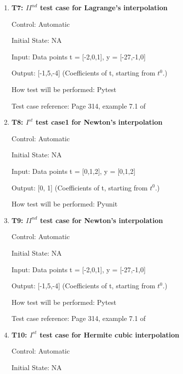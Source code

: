 \documentclass[12pt, titlepage]{article}
\begin{document}
\begin{enumerate}
\item{\textbf{T7: ${II}^{nd}$ test case for Lagrange's interpolation} \\}

Control: Automatic

Initial State: NA

Input: Data points t = [-2,0,1], y = [-27,-1,0]

Output: [-1,5,-4] (Coefficients of t, starting from $t^{0}$.)

How test will be performed: Pytest

Test case reference: Page 314, example 7.1 of  ~\cite{Health1997}\\


\item{\textbf{T8: $I^{st}$ test case1 for Newton's interpolation} \\}

Control: Automatic 

Initial State: NA

Input: Data points t = [0,1,2], y = [0,1,2]

Output: [0, 1] (Coefficients of t, starting from $t^{0}$.)

How test will be performed: Pyunit\\


\item{\textbf{T9: ${II}^{nd}$ test case for Newton's interpolation} \\}

Control: Automatic

Initial State: NA

Input: Data points t = [-2,0,1], y = [-27,-1,0]

Output: [-1,5,-4] (Coefficients of t, starting from $t^{0}$.)

How test will be performed: Pytest

Test case reference: Page 314, example 7.1 of \cite{Health1997}\\




\item{\textbf{T10: $I^{st}$ test case for Hermite cubic interpolation }\\}

Control: Automatic 

Initial State: NA


\end{enumerate}
\end{document}
